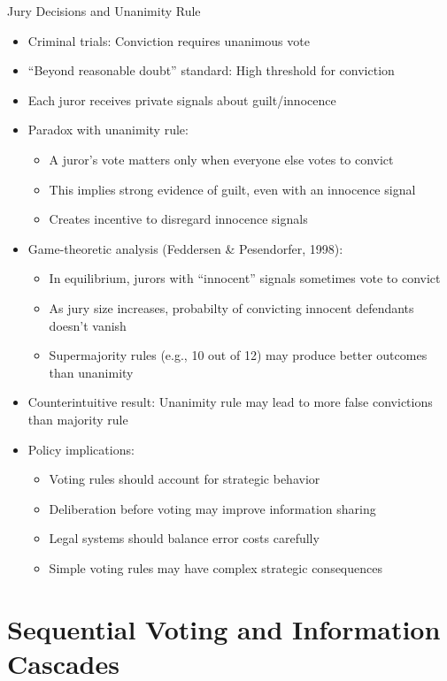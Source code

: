 \documentclass[10pt,handout]{beamer}
\begin{document}
\begin{frame}{Jury Decisions and Unanimity Rule}
  \begin{itemize}[<+->]
    \item Criminal trials: Conviction requires unanimous vote
    \item ``Beyond reasonable doubt'' standard: High threshold for conviction
    \item Each juror receives private signals about guilt/innocence
    \item Paradox with unanimity rule:
      \begin{itemize}
        \item A juror's vote matters only when everyone else votes to convict
        \item This implies strong evidence of guilt, even with an innocence signal
        \item Creates incentive to disregard innocence signals
      \end{itemize}
    \item Game-theoretic analysis (Feddersen \& Pesendorfer, 1998):
      \begin{itemize}
        \item In equilibrium, jurors with ``innocent'' signals sometimes vote to convict
        \item As jury size increases, probabilty of convicting innocent defendants doesn't vanish
        \item Supermajority rules (e.g., 10 out of 12) may produce better outcomes than unanimity
      \end{itemize}
    \item Counterintuitive result: Unanimity rule may lead to more false convictions than majority rule
    \item Policy implications:
      \begin{itemize}
        \item Voting rules should account for strategic behavior
        \item Deliberation before voting may improve information sharing
        \item Legal systems should balance error costs carefully
        \item Simple voting rules may have complex strategic consequences
      \end{itemize}
  \end{itemize}
\end{frame}

\section{Sequential Voting and Information Cascades}
\end{document}
